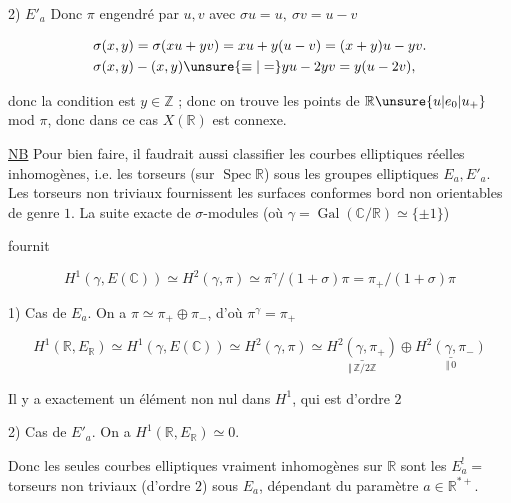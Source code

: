 

2) \uline{$E'_a$} Donc $\pi$ engendré par $u,v$ avec $\sigma u=u,\ \sigma v=u-v$

\[
\begin{aligned}
&\sigma(x,y)=\sigma(xu+yv)=xu+y(u-v)=(x+y)u-yv.\\
&\sigma(x,y)-(x,y)\unsure{\equiv|=}yu-2yv=y(u-2v),
\end{aligned}
\]

donc la condition est $y\in\mathbb Z$ ; donc on trouve  les points de $\mathbb R\unsure{u|e_0|u_+}$ mod $\pi$, donc dans ce cas $X(\mathbb R)$ est connexe.


\uline{NB} Pour bien faire, il faudrait aussi classifier les courbes elliptiques réelles inhomogènes, i.e. les torseurs (sur $\operatorname{Spec}\mathbb R$) sous les  groupes elliptiques $E_a,E'_a$. Les torseurs non triviaux fournissent les surfaces conformes  bord non orientables de genre $1$. La suite exacte de $\sigma$-modules (où $\gamma=\operatorname{Gal}(\mathbb C/\mathbb R)\simeq\{\pm1\}$)


fournit

\[
H^1(\gamma,E(\mathbb C))\simeq H^2(\gamma,\pi)\simeq\pi^\gamma/(1+\sigma)\pi=\pi_+/(1+\sigma)\pi
\]

1) Cas de $E_a$. On a $\pi\simeq\pi_+\oplus\pi_-$, d'où $\pi^\gamma=\pi_+$

\[
H^1(\mathbb R,E_{\mathbb R})\simeq H^1(\gamma,E(\mathbb C))\simeq H^2(\gamma,\pi)\simeq
\underset{\Vert\,\mathbb Z/2\mathbb Z}{\underline{H^2(\gamma,\pi_+)}}\oplus
\underset{\Vert\,0}{\underline{H^2(\gamma,\pi_-)}}
\]

Il y a exactement un élément non nul dans $H^1$, qui est d'ordre $2$

2) Cas de $E'_a$. On a $H^1(\mathbb R,E_{\mathbb R})\simeq0$.

Donc les seules courbes elliptiques vraiment inhomogènes sur $\mathbb R$ sont les $E_a^{!}=$  torseurs  non triviaux (d'ordre $2$) sous $E_a$, dépendant du paramètre $a\in\mathbb R^{*+}$.
